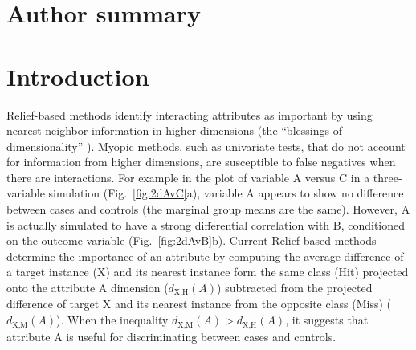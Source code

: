 \documentclass[10pt,letterpaper]{article}\usepackage[]{graphicx}\usepackage[]{color}
\begin{document}
\section*{Author summary}

\linenumbers

\section*{Introduction}

Relief-based methods identify interacting attributes as important by using nearest-neighbor information in higher dimensions (the ``blessings of dimensionality'' ). Myopic methods, such as univariate tests, that do not account for information from higher dimensions, are susceptible to false negatives when there are interactions. For example in the plot of variable A versus C in a three-variable simulation (Fig.~\ref{fig:2dAvC}a), variable A appears to show no difference between cases and controls (the marginal group means are the same). However, A is actually simulated to have a strong differential correlation with B, conditioned on the outcome variable (Fig.~\ref{fig:2dAvB}b). Current Relief-based methods determine the importance of an attribute by computing the average difference of a target instance (X) and its nearest instance form the same class (Hit) projected onto the attribute A dimension ($d_{\text{X,H}}(A)$) subtracted from the projected difference of target X and its nearest instance from the opposite class (Miss) ($d_{\text{X,M}}(A)$). When the inequality $d_{\text{X,M}}(A)>d_{\text{X,H}}(A)$, it suggests that attribute A is useful for discriminating between cases and controls.  
\end{document}
